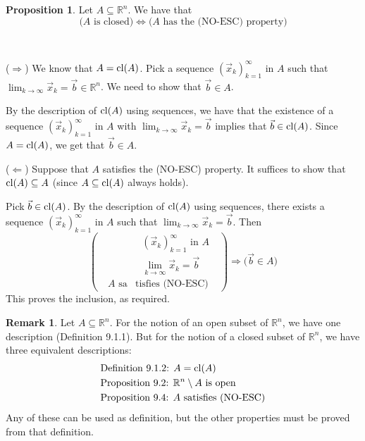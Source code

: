 \documentclass[11pt]{article}
\makeatletter
\theoremstyle{definition}
\newtheorem{prop}[thm]{Proposition}
\newtheorem{remark}[thm]{Remark}
\newcommand{\R}{\ensuremath{\mathbb{R}}}
\newenvironment{pf}[1][\proofname]{\par
  \pushQED{\qed}%
  \normalfont \topsep0\p@\relax
  \trivlist
  \item[\hskip\labelsep\itshape
  #1\@addpunct{.}]\ignorespaces
}{%
  \popQED\endtrivlist\@endpefalse
}
\makeatother
\begin{document}
\begin{prop}
Let $A \subseteq \R^n$. We have that
\[ \Big( \text{$A$ is closed} \Big) \Leftrightarrow \Big( \text{$A$ has the (NO-ESC) property} \Big) \]
\end{prop}
\begin{pf}~

($\Rightarrow$) We know that $A = {\rm cl}(A)$. Pick a sequence $(\vec{x}_k)_{k=1}^\infty$ in $A$ such that $\lim_{k\to\infty} \vec{x}_k = \vec{b} \in \R^n$. We need to show that $\vec{b} \in A$. 

By the description of ${\rm cl}(A)$ using sequences, we have that the existence of a sequence $(\vec{x}_k)_{k=1}^\infty$ in $A$ with $\lim_{k\to\infty} \vec{x}_k = \vec{b}$ implies that $\vec{b} \in {\rm cl}(A)$. Since $A = {\rm cl}(A)$, we get that $\vec{b} \in A$.

($\Leftarrow$) Suppose that $A$ satisfies the (NO-ESC) property. It suffices to show that ${\rm cl}(A) \subseteq A$ (since $A \subseteq {\rm cl}(A)$ always holds). 

Pick $\vec{b} \in {\rm cl}(A)$. By the description of ${\rm cl}(A)$ using sequences, there exists a sequence $(\vec{x}_k)_{k=1}^\infty$ in $A$ such that $\lim_{k\to\infty} \vec{x}_k = \vec{b}$. Then 
\[ \left( \begin{aligned} &\text{ $(\vec{x}_k)_{k=1}^\infty$ in $A$ } \\ &\text{ $\lim_{k\to\infty} \vec{x}_k = \vec{b}$ } \\ \text{ $A$ sa} & \text{tisfies (NO-ESC) } \end{aligned} \right) \Rightarrow \Big( \vec{b} \in A \Big) \]
This proves the inclusion, as required.
\end{pf}

\begin{remark}
Let $A \subseteq \R^n$. For the notion of an open subset of $\R^n$, we have one description (Definition 9.1.1). But for the notion of a closed subset of $\R^n$, we have three equivalent descriptions: 
\begin{align*}
    & \text{Definition 9.1.2: } A = {\rm cl}(A) \\
    & \text{Proposition 9.2: } \text{$\R^n \setminus A$ is open} \\
    & \text{Proposition 9.4: } \text{$A$ satisfies (NO-ESC)}
\end{align*}
Any of these can be used as definition, but the other properties must be proved from that definition.
\end{remark}
\end{document}
